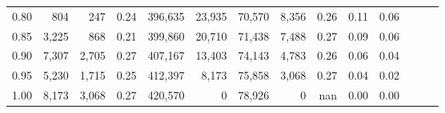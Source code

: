\begin{tabular}{rrrrrrrrrrrrrr}
0.80 &      804 &     247 &  0.24 &  396,635 &   23,935 &  70,570 &   8,356 &  0.26 &  0.11 &      0.06 \\
0.85 &    3,225 &     868 &  0.21 &  399,860 &   20,710 &  71,438 &   7,488 &  0.27 &  0.09 &      0.06 \\
0.90 &    7,307 &   2,705 &  0.27 &  407,167 &   13,403 &  74,143 &   4,783 &  0.26 &  0.06 &      0.04 \\
0.95 &    5,230 &   1,715 &  0.25 &  412,397 &    8,173 &  75,858 &   3,068 &  0.27 &  0.04 &      0.02 \\
1.00 &    8,173 &   3,068 &  0.27 &  420,570 &        0 &  78,926 &       0 &   nan &  0.00 &      0.00 \\
\bottomrule
\end{tabular}
